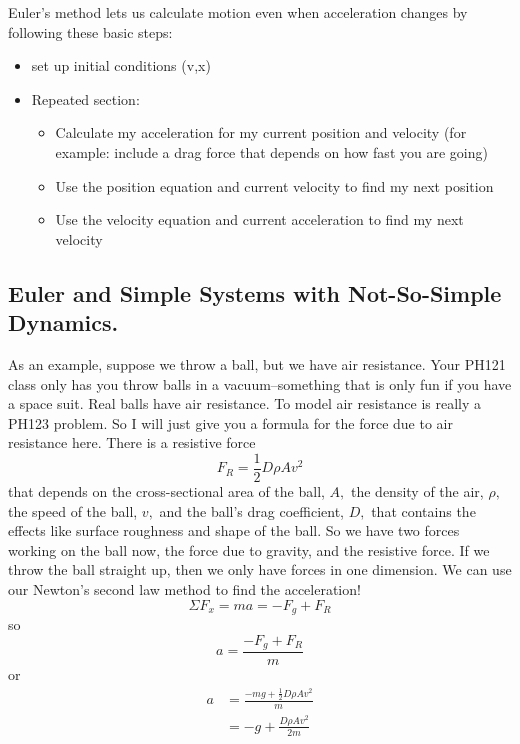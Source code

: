 \documentclass[twoside,11pt,ShortChapTitles]{BYUTextbook}
\begin{document}
Euler's method lets us calculate motion even when acceleration changes by following these basic steps:
\begin{itemize}
\item set up initial conditions (v,x)
\item Repeated section:
\begin{itemize}
\item Calculate my acceleration for my current position and velocity (for example: include a drag force that depends on how fast you are going)
\item Use the position equation and current velocity to find my next position
\item Use the velocity equation and current acceleration to find my next velocity

\end{itemize}

\end{itemize}


\subsection{Euler and Simple Systems with Not-So-Simple Dynamics.}

As an example, suppose we throw a ball, but we have air resistance. Your PH121 class only has
you throw balls in a vacuum--something that is only fun if you have a space
suit. Real balls have air resistance. To model air resistance is really a
PH123 problem. So I will just give you a formula for the force due to air
resistance here. There is a resistive force
\[
F_{R}=\frac{1}{2}D\rho Av^{2}
\]
that depends on the cross-sectional area of the ball, $A,$ the density of the
air, $\rho,$ the speed of the ball, $v,$ and the ball's drag coefficient, $D,$
that contains the effects like surface roughness and shape of the ball. So we
have two forces working on the ball now, the force due to gravity, and the
resistive force. If we throw the ball straight up, then we only have forces in
one dimension. We can use our Newton's second law method to find the acceleration! 
\[
\Sigma F_{x}=ma=-F_{g}+F_{R}
\]
so \[
a=\frac{-F_{g}+F_{R}}{m}
\]
or \begin{align*}
a  & =\frac{-mg+\frac{1}{2}D\rho Av^{2}}{m}\\
& =-g+\frac{D\rho Av^{2}}{2m} \end{align*}
\end{document}

